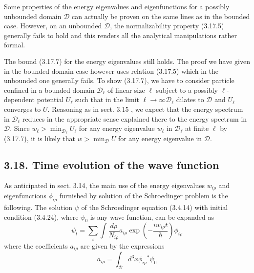 \documentclass{article}
\begin{document}
Some properties of the energy eigenvalues and eigenfunctions for a possibly
unbounded domain $\mathcal{D}$ can actually be proven on the same lines as in the bounded case. However, on an unbounded $\mathcal{D}$, the normalizability property (3.17.5) generally fails to hold and this renders all the analytical manipulations rather formal.

The bound (3.17.7) for the energy eigenvalues still holds. The proof we have given in the bounded domain case however uses relation (3.17.5) which in the unbounded one generally fails. To show (3.17.7), we have to consider particle confined in a bounded domain $\mathcal{D}_{\ell}$ of linear size $\ell$ subject to a possibly $\ell$-dependent potential $U_{\ell}$ such that in the limit $\ell \rightarrow \infty \mathcal{D}_{\ell}$ dilates to $\mathcal{D}$ and $U_{\ell}$ converges to $U$. Reasoning as in sect. 3.15 , we expect that the energy spectrum in $\mathcal{D}_{\ell}$ reduces in the appropriate sense explained there to the energy spectrum in $\mathcal{D}$. Since $w_{\ell}>\min _{\mathcal{D}_{\ell}} U_{\ell}$ for any energy eigenvalue $w_{\ell}$ in $\mathcal{D}_{\ell}$ at finite $\ell$ by (3.17.7), it is likely that $w>\min _{\mathcal{D}} U$ for any energy eigenvalue in $\mathcal{D}$.

\subsection*{3.18. Time evolution of the wave function}

As anticipated in sect. 3.14, the main use of the energy eigenvalues $w_{i \rho}$ and eigenfunctions $\phi_{i \rho}$ furnished by solution of the Schroedinger problem is the following. The solution $\psi$ of the Schroedinger equation (3.4.14) with initial condition (3.4.24), where $\psi_{0}$ is any wave function, can be expanded as
$$
\begin{equation*}
\psi_{t}=\sum_{i} \int \frac{d \rho}{N_{i \rho}} a_{i \rho} \exp \left(-\frac{i w_{i \rho} t}{\hbar}\right) \phi_{i \rho} \tag{3.18.1}
\end{equation*}
$$
where the coefficients $a_{i \rho}$ are given by the expressions
$$
\begin{equation*}
a_{i \rho}=\int_{\mathcal{D}} d^{3} x \phi_{i \rho}{ }^{*} \psi_{0} \tag{3.18.2}
\end{equation*}
$$
\end{document}
